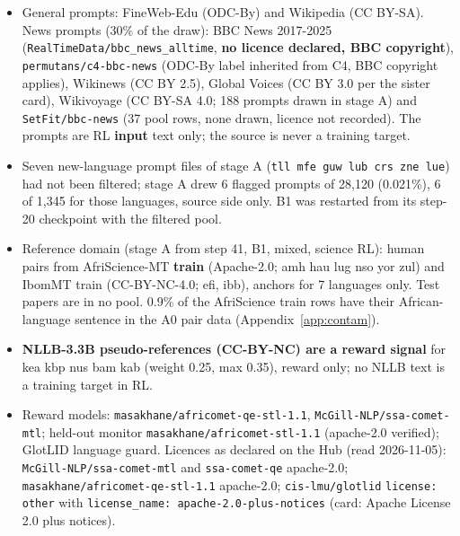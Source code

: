\begin{itemize}
\item General prompts: FineWeb-Edu (ODC-By) and Wikipedia (CC BY-SA). News prompts (30\% of the draw): BBC News 2017-2025 (\texttt{RealTimeData/\allowbreak{}bbc\_\allowbreak{}news\_\allowbreak{}alltime}, \textbf{no licence declared, BBC copyright}), \texttt{permutans/\allowbreak{}c4-\allowbreak{}bbc-\allowbreak{}news} (ODC-By label inherited from C4, BBC copyright applies), Wikinews (CC BY 2.5), Global Voices (CC BY 3.0 per the sister card), Wikivoyage (CC BY-SA 4.0; 188 prompts drawn in stage A) and \texttt{SetFit/\allowbreak{}bbc-\allowbreak{}news} (37 pool rows, none drawn, licence not recorded). The prompts are RL \textbf{input} text only; the source is never a training target.
\item Seven new-language prompt files of stage A (\texttt{tll mfe guw lub crs zne lue}) had not been filtered; stage A drew 6 flagged prompts of 28,120 (0.021\%), 6 of 1,345 for those languages, source side only. B1 was restarted from its step-20 checkpoint with the filtered pool.
\item Reference domain (stage A from step 41, B1, mixed, science RL): human pairs from AfriScience-MT \textbf{train} (Apache-2.0; amh hau lug nso yor zul) and IbomMT train (CC-BY-NC-4.0; efi, ibb), anchors for 7 languages only. Test papers are in no pool. 0.9\% of the AfriScience train rows have their African-language sentence in the A0 pair data (Appendix~\ref{app:contam}).
\item \textbf{NLLB-3.3B pseudo-references (CC-BY-NC) are a reward signal} for kea kbp nus bam kab (weight 0.25, max 0.35), reward only; no NLLB text is a training target in RL.
\item Reward models: \texttt{masakhane/\allowbreak{}africomet-\allowbreak{}qe-\allowbreak{}stl-\allowbreak{}1.\allowbreak{}1}, \texttt{McGill-\allowbreak{}NLP/\allowbreak{}ssa-\allowbreak{}comet-\allowbreak{}mtl}; held-out monitor \texttt{masakhane/\allowbreak{}africomet-\allowbreak{}stl-\allowbreak{}1.\allowbreak{}1} (apache-2.0 verified); GlotLID language guard. Licences as declared on the Hub (read 2026-11-05): \texttt{McGill-\allowbreak{}NLP/\allowbreak{}ssa-\allowbreak{}comet-\allowbreak{}mtl} and \texttt{ssa-\allowbreak{}comet-\allowbreak{}qe} apache-2.0; \texttt{masakhane/\allowbreak{}africomet-\allowbreak{}qe-\allowbreak{}stl-\allowbreak{}1.\allowbreak{}1} apache-2.0; \texttt{cis-\allowbreak{}lmu/\allowbreak{}glotlid} \texttt{license: other} with \texttt{license\_\allowbreak{}name: apache-\allowbreak{}2.\allowbreak{}0-\allowbreak{}plus-\allowbreak{}notices} (card: Apache License 2.0 plus notices).

\end{itemize}

